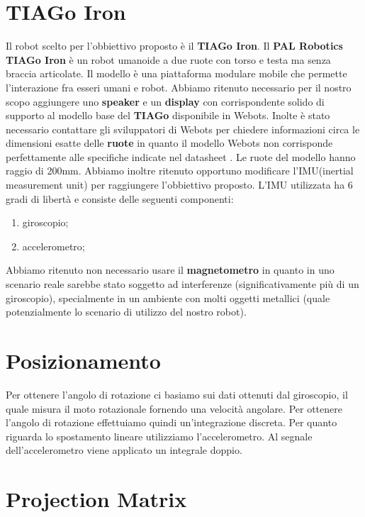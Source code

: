\documentclass[a4paper]{article}
\begin{document}
	\section{TIAGo Iron} 
	Il robot scelto per l'obbiettivo proposto è il \textbf{TIAGo Iron}. \newline Il \textbf{PAL Robotics TIAGo Iron} \cite{tiagoiron} è un robot umanoide a due ruote con torso e testa ma senza braccia articolate. Il modello è una piattaforma modulare mobile che permette l'interazione fra esseri umani e robot. \newline
	Abbiamo ritenuto necessario per il nostro scopo aggiungere uno \textbf{speaker} e un \textbf{display} con corrispondente solido di supporto al modello base del \textbf{TIAGo} disponibile in Webots.
	Inolte è stato necessario contattare gli sviluppatori di Webots per chiedere informazioni circa le dimensioni esatte delle \textbf{ruote} in quanto il modello Webots non corrisponde perfettamente alle specifiche indicate nel datasheet \cite{Tiago IRON datasheet}. Le ruote del modello hanno raggio di 200mm. \newline
	\newline Abbiamo inoltre ritenuto opportuno modificare l'IMU(inertial measurement unit) per raggiungere l'obbiettivo proposto. L'IMU utilizzata ha 6 gradi di libertà e consiste delle seguenti componenti:
	\begin{enumerate}
		\item giroscopio;	
		\item accelerometro;
	\end{enumerate}
	Abbiamo ritenuto non necessario usare il \textbf{magnetometro} in quanto in uno scenario reale sarebbe stato soggetto ad interferenze (significativamente più di un giroscopio), specialmente in un ambiente con molti oggetti metallici (quale potenzialmente lo scenario di utilizzo del nostro robot).

	\section{Posizionamento}
	Per ottenere l'angolo di rotazione ci basiamo sui dati ottenuti dal giroscopio, il quale misura il moto rotazionale fornendo una velocità angolare. Per ottenere l'angolo di rotazione effettuiamo quindi un'integrazione discreta. Per quanto riguarda lo spostamento lineare utilizziamo l'accelerometro. Al segnale dell'accelerometro viene applicato un integrale doppio.
	
	\section{Projection Matrix}
	\cite{OpenGL}
	
\end{document}
